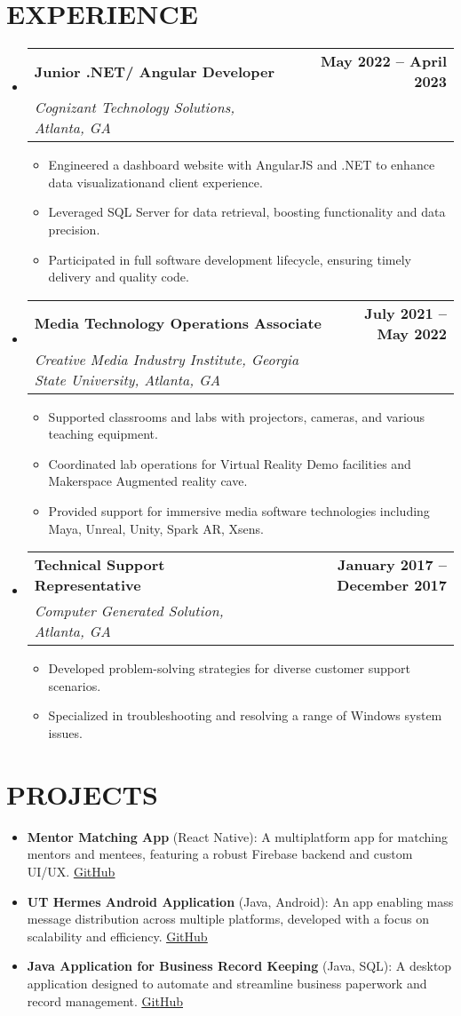 \documentclass[letterpaper,11pt]{article}
\makeatletter
\newcommand{\resumeItem}[1]{
  \item\small{
    {#1 \vspace{-1pt}}
  }
}
\newcommand{\resumeSubheading}[4]{
  \vspace{-2pt}\item
    \begin{tabular*}{1.0\textwidth}[t]{l@{\extracolsep{\fill}}r}
      \textbf{\large#1} & \textbf{\small #2} \\
      \textit{\large#3} & \textit{\small #4} \\
      
    \end{tabular*}\vspace{-7pt}
}
\newcommand{\resumeSubHeadingListStart}{\begin{itemize}[leftmargin=0.0in, label={}]}
\newcommand{\resumeSubHeadingListEnd}{\end{itemize}}
\newcommand{\resumeItemListStart}{\begin{itemize}[leftmargin=0.1in]}
\newcommand{\resumeItemListEnd}{\end{itemize}\vspace{-5pt}}
\makeatother
\begin{document}
\section{\color{airforceblue}EXPERIENCE}
  \resumeSubHeadingListStart
    \resumeSubheading
      {Junior .NET/ Angular Developer}{May 2022 – April 2023}
      {Cognizant Technology Solutions, Atlanta, GA}{}
      \resumeItemListStart
        \resumeItem{Engineered a dashboard website with AngularJS and .NET to enhance data visualizationand client experience.}
        \resumeItem{Leveraged SQL Server for data retrieval, boosting functionality and data precision.}
        \resumeItem{Participated in full software development lifecycle, ensuring timely delivery and quality code.}
      \resumeItemListEnd  
    \resumeSubheading
      {Media Technology Operations Associate}{July 2021 – May 2022}
      {Creative Media Industry Institute, Georgia State University, Atlanta, GA}{}
      \resumeItemListStart
        \resumeItem{Supported classrooms and labs with projectors, cameras, and various teaching equipment.}
        \resumeItem{Coordinated lab operations for Virtual Reality Demo facilities and Makerspace Augmented reality cave.}
        \resumeItem{Provided support for immersive media software technologies including Maya, Unreal, Unity, Spark AR, Xsens.}
      \resumeItemListEnd  
    \resumeSubheading
      {Technical Support Representative}{January 2017 – December 2017}
      {Computer Generated Solution, Atlanta, GA}{}
      \resumeItemListStart
        \resumeItem{Developed problem-solving strategies for diverse customer support scenarios.}
        \resumeItem{Specialized in troubleshooting and resolving a range of Windows system issues.}
      \resumeItemListEnd  
  \resumeSubHeadingListEnd

\section{\color{airforceblue}PROJECTS}    
    \resumeItemListStart
        \resumeItem{\textbf{Mentor Matching App} (React Native): A multiplatform app for matching mentors and mentees, featuring a robust Firebase backend and custom UI/UX. \href{https://github.com/Sudoaj}{\color{blue}\underline{GitHub}}}
        \resumeItem{\textbf{UT Hermes Android Application} (Java, Android): An app enabling mass message distribution across multiple platforms, developed with a focus on scalability and efficiency. \href{https://github.com/Sudoaj}{\color{blue}\underline{GitHub}}}
        \resumeItem{\textbf{Java Application for Business Record Keeping} (Java, SQL): A desktop application designed to automate and streamline business paperwork and record management. \href{https://github.com/Sudoaj}{\color{blue}\underline{GitHub}}}
    \resumeItemListEnd  
\end{document}
